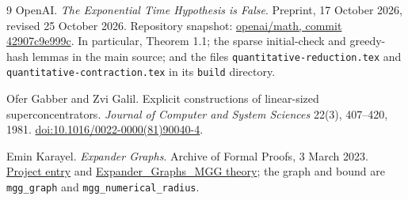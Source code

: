 \documentclass[11pt]{article}
\theoremstyle{remark}
\begin{document}
\begingroup\small
\begin{thebibliography}{9}
OpenAI.
\emph{The Exponential Time Hypothesis is False}.
Preprint, 17 October 2026, revised 25 October 2026.
Repository snapshot:
\href{https://github.com/openai/math/tree/42907c9e999cc00d6abe7a50bfc1023250edd1b9/preprints/The-Exponential-Time-Hypothesis-is-False-October-25-2026}{openai/math, commit 42907c9e999c}.
In particular, Theorem 1.1; the sparse initial-check and greedy-hash
lemmas in the main source; and the files
\texttt{quantitative-reduction.tex} and
\texttt{quantitative-contraction.tex} in its \texttt{build} directory.

Ofer Gabber and Zvi Galil.
Explicit constructions of linear-sized superconcentrators.
\emph{Journal of Computer and System Sciences} 22(3), 407--420, 1981.
\href{https://doi.org/10.1016/0022-0000(81)90040-4}
{doi:10.1016/0022-0000(81)90040-4}.

Emin Karayel.
\emph{Expander Graphs}.
Archive of Formal Proofs, 3 March 2023.
\href{https://isa-afp.org/entries/Expander_Graphs.html}
{Project entry} and
\href{https://isa-afp.org/browser_info/current/AFP/Expander_Graphs/Expander_Graphs_MGG.html}
{Expander\_Graphs\_MGG theory};
the graph and bound are \texttt{mgg\_graph} and
\texttt{mgg\_numerical\_radius}.
\end{thebibliography}
\endgroup
\end{document}

